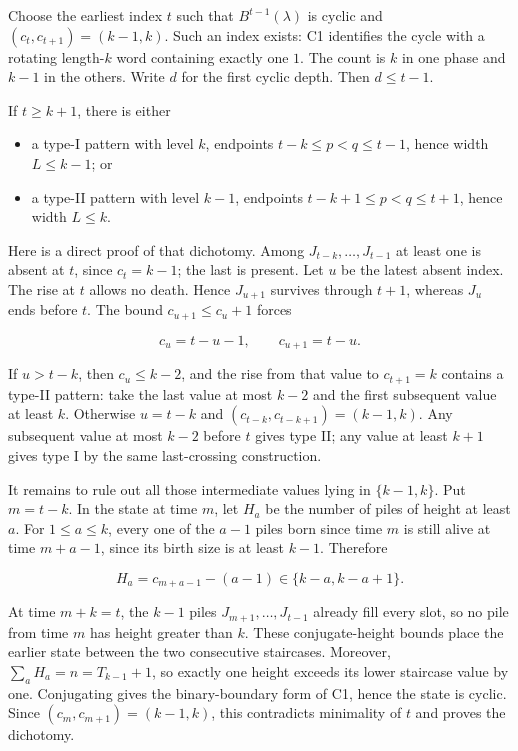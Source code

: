 \documentclass[11pt,a4paper]{article}
\providecommand{\tightlist}{\setlength{\itemsep}{0pt}\setlength{\parskip}{0pt}}
\begin{document}
Choose the earliest index \(t\) such that \(B^{t-1}(\lambda)\) is cyclic and \((c_t,c_{t+1})=(k-1,k)\). Such an index exists: C1 identifies the cycle with a rotating length-\(k\) word containing exactly one \(1\). The count is \(k\) in one phase and \(k-1\) in the others. Write \(d\) for the first cyclic depth. Then \(d\le t-1\).

If \(t\ge k+1\), there is either

\begin{itemize}
\tightlist
\item
  a type-I pattern with level \(k\), endpoints \(t-k\le p<q\le t-1\), hence width \(L\le k-1\); or
\item
  a type-II pattern with level \(k-1\), endpoints \(t-k+1\le p<q\le t+1\), hence width \(L\le k\).
\end{itemize}

Here is a direct proof of that dichotomy. Among \(J_{t-k},\ldots,J_{t-1}\) at least one is absent at \(t\), since \(c_t=k-1\); the last is present. Let \(u\) be the latest absent index. The rise at \(t\) allows no death. Hence \(J_{u+1}\) survives through \(t+1\), whereas \(J_u\) ends before \(t\). The bound \(c_{u+1}\le c_u+1\) forces

\[
c_u=t-u-1,\qquad c_{u+1}=t-u.
\]

If \(u>t-k\), then \(c_u\le k-2\), and the rise from that value to \(c_{t+1}=k\) contains a type-II pattern: take the last value at most \(k-2\) and the first subsequent value at least \(k\). Otherwise \(u=t-k\) and \((c_{t-k},c_{t-k+1})=(k-1,k)\). Any subsequent value at most \(k-2\) before \(t\) gives type II; any value at least \(k+1\) gives type I by the same last-crossing construction.

It remains to rule out all those intermediate values lying in \(\{k-1,k\}\). Put \(m=t-k\). In the state at time \(m\), let \(H_a\) be the number of piles of height at least \(a\). For \(1\le a\le k\), every one of the \(a-1\) piles born since time \(m\) is still alive at time \(m+a-1\), since its birth size is at least \(k-1\). Therefore

\[
H_a=c_{m+a-1}-(a-1)\in\{k-a,k-a+1\}.
\]

At time \(m+k=t\), the \(k-1\) piles \(J_{m+1},\ldots,J_{t-1}\) already fill every slot, so no pile from time \(m\) has height greater than \(k\). These conjugate-height bounds place the earlier state between the two consecutive staircases. Moreover, \(\sum_a H_a=n=T_{k-1}+1\), so exactly one height exceeds its lower staircase value by one. Conjugating gives the binary-boundary form of C1, hence the state is cyclic. Since \((c_m,c_{m+1})=(k-1,k)\), this contradicts minimality of \(t\) and proves the dichotomy.
\end{document}
